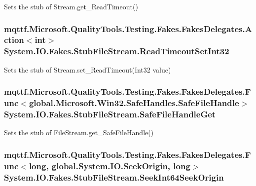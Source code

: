 Sets the stub of Stream.\-get\-\_\-\-Read\-Timeout()

\hypertarget{class_system_1_1_i_o_1_1_fakes_1_1_stub_file_stream_a39f07d7ff5cfe42b9f9691ef1e5d9c7d}{
\subsubsection[{Read\-Timeout\-Set\-Int32}]{\setlength{\rightskip}{0pt plus 5cm}mqttf.\-Microsoft.\-Quality\-Tools.\-Testing.\-Fakes.\-Fakes\-Delegates.\-Action$<$int$>$ System.\-I\-O.\-Fakes.\-Stub\-File\-Stream.\-Read\-Timeout\-Set\-Int32}}\label{class_system_1_1_i_o_1_1_fakes_1_1_stub_file_stream_a39f07d7ff5cfe42b9f9691ef1e5d9c7d}


Sets the stub of Stream.\-set\-\_\-\-Read\-Timeout(\-Int32 value)

\hypertarget{class_system_1_1_i_o_1_1_fakes_1_1_stub_file_stream_aecd9cad5f5f536e5dfd217195d82458e}{
\subsubsection[{Safe\-File\-Handle\-Get}]{\setlength{\rightskip}{0pt plus 5cm}mqttf.\-Microsoft.\-Quality\-Tools.\-Testing.\-Fakes.\-Fakes\-Delegates.\-Func$<$global.\-Microsoft.\-Win32.\-Safe\-Handles.\-Safe\-File\-Handle$>$ System.\-I\-O.\-Fakes.\-Stub\-File\-Stream.\-Safe\-File\-Handle\-Get}}\label{class_system_1_1_i_o_1_1_fakes_1_1_stub_file_stream_aecd9cad5f5f536e5dfd217195d82458e}


Sets the stub of File\-Stream.\-get\-\_\-\-Safe\-File\-Handle()

\hypertarget{class_system_1_1_i_o_1_1_fakes_1_1_stub_file_stream_a4b714310ba4cbe1d61531250d43da8f9}{
\subsubsection[{Seek\-Int64\-Seek\-Origin}]{\setlength{\rightskip}{0pt plus 5cm}mqttf.\-Microsoft.\-Quality\-Tools.\-Testing.\-Fakes.\-Fakes\-Delegates.\-Func$<$long, global.\-System.\-I\-O.\-Seek\-Origin, long$>$ System.\-I\-O.\-Fakes.\-Stub\-File\-Stream.\-Seek\-Int64\-Seek\-Origin}}\label{class_system_1_1_i_o_1_1_fakes_1_1_stub_file_stream_a4b714310ba4cbe1d61531250d43da8f9}



